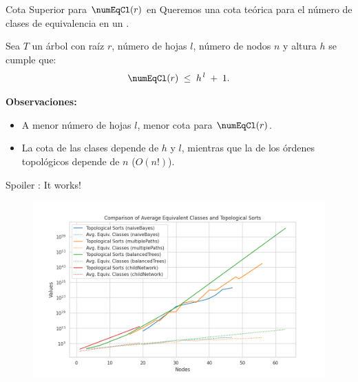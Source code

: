 \begin{frame}{Cota Superior para \(\numEqCl(r)\) en \dtrees}
	\small
	Queremos una cota teórica para el número de clases de equivalencia 
	en un \dtree.
	
	\begin{lemma}\label{lemma:upper_bound_equivalence_classes}
		Sea \(T\) un árbol con raíz \(r\), número de hojas \(l\), número de nodos $n$ y altura \(h\) se cumple que:
		\[
		\numEqCl(r) \;\le\; h^{\,l} \;+\; 1.
		\]
	\end{lemma}
	\pause 
	
	\medskip
	\textbf{Observaciones:}
	\begin{itemize}[<+->]
		\item A menor número de hojas \(l\), menor cota para \(\numEqCl(r)\).
		\item La cota de las clases depende de \(h\) y \(l\), mientras que 
		la de los órdenes topológicos depende de \(n\) (\(O(n!)\)).
		
	\end{itemize}
\end{frame}

\begin{frame}{Spoiler : It works!}
	\begin{figure}
		\centering
		\includegraphics[width=1\linewidth]{pic/img/equivalentClassesVsToposorts.png}
	\end{figure}
\end{frame}

